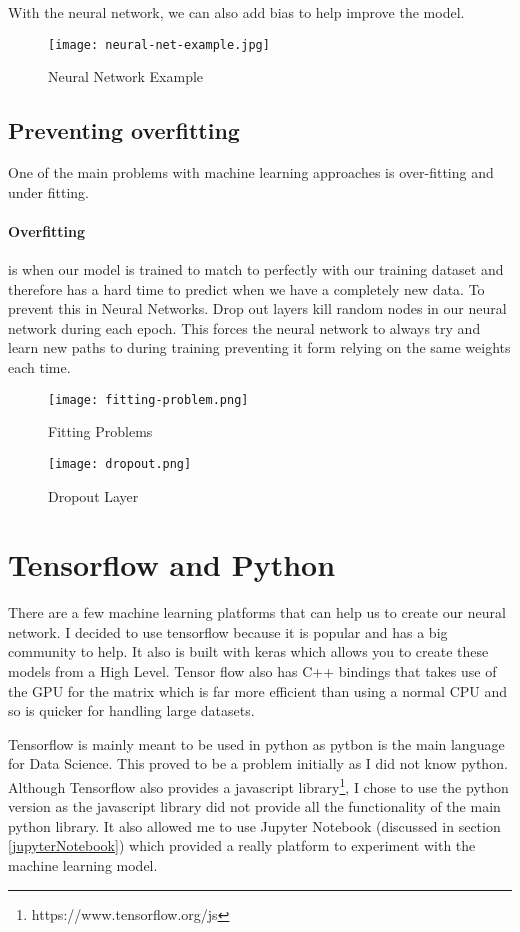 With the neural network, we can also add bias to help improve the model.

\begin{figure}[ht]
    \centering
    \texttt{[image: neural-net-example.jpg]}
    \caption{Neural Network Example}
    \label{fig:neuralNetworkExample}
\end{figure}

\subsection{Preventing overfitting}
One of the main problems with machine learning approaches is over-fitting and under fitting.

\paragraph{Overfitting} is when our model is trained to match to perfectly with our training dataset and therefore has a hard time to predict when we have a completely new data. To prevent this in Neural Networks. Drop out layers kill random nodes in our neural network during each epoch. This forces the neural network to always try and learn new paths to during training preventing it form relying on the same weights each time.

\begin{figure}[ht]
    \centering
    \texttt{[image: fitting-problem.png]}
    \caption{Fitting Problems}
    \label{fig:fittingProblems}
\end{figure}


\begin{figure}[ht]
    \centering
    \texttt{[image: dropout.png]}
    \caption{Dropout Layer}
    \label{fig:dropoutLayer}
\end{figure}
\section{Tensorflow and Python}
There are a few machine learning platforms that can help us to create our neural network. I decided to use tensorflow because it is popular and has a big community to help. It also is built with keras which allows you to create these models from a High Level. Tensor flow also has C++ bindings that takes use of the GPU for the matrix which is far more efficient than using a normal CPU and so is quicker for handling large datasets.

Tensorflow is mainly meant to be used in python as pytbon is the main language for Data Science. This proved to be a problem initially as I did not know python. Although Tensorflow also provides a javascript library\footnote{https://www.tensorflow.org/js}, I chose to use the python version as the javascript library did not provide all the functionality of the main python library. It also allowed me to use Jupyter Notebook (discussed in section \ref{jupyterNotebook}) which provided a really platform to experiment with the machine learning model.

